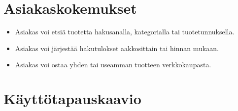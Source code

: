 \documentclass{article}
\begin{document}
\section{Asiakaskokemukset}

\begin{itemize}
    \item Asiakas voi etsiä tuotetta hakusanalla, kategorialla tai tuotetunnuksella.
    \item Asiakas voi järjestää hakutulokset aakkosittain tai hinnan mukaan.
    \item Asiakas voi ostaa yhden tai useamman tuotteen verkkokaupasta.
\end{itemize}

\section{Käyttötapauskaavio}
\end{document}
